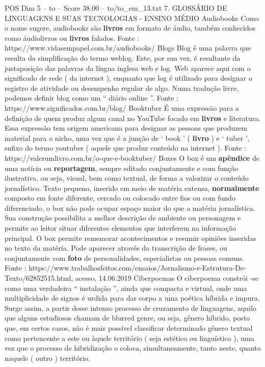 \begin{textsample}{POS Dim 5 – to – Score 38.00 – to/to\_em\_13.txt}  \label{ex:f5_pos_022}
7.
GLOSSÁRIO DE LINGUAGENS E SUAS TECNOLOGIAS - ENSINO MÉDIO Audiobooks Como o nome sugere, audiobooks são \textbf{livros} em formato de áudio, também conhecidos como áudiolivros ou \textbf{livros} falados.
Fonte : https://www.vidasempapel.com.br/audiobooks/ Blogs Blog é uma palavra que resulta da simplificação do termo weblog.
Este, por sua vez, é resultante da justaposição das palavras da língua inglesa web e log.
Web aparece aqui com o significado de rede ( da internet ), enquanto que log é utilizado para designar o registro de atividade ou desempenho regular de algo.
Numa tradução livre, podemos definir blog como um “ diário online ”.
Fonte : https://www.significados.com.br/blog/ Booktuber É uma expressão para a definição de quem produz algum canal no YouTube focado em \textbf{livros} e literatura.
Essa expressão tem origem americana para designar as pessoas que produzem material para o nicho, uma vez que é a junção de ‘ book ’ ( \textbf{livro} ) e ‘ tuber ’, sufixo do termo youtuber ( aquele que produz conteúdo na internet ).
Fonte : https://valerumlivro.com.br/o-que-e-booktuber/ Boxes O box é um \textbf{apêndice} de uma notícia ou \textbf{reportagem}, sempre editado conjuntamente e com função ilustrativa, ou seja, visual, bem como textual, de forma a valorizar o conteúdo jornalístico.
Texto pequeno, inserido em meio de matéria extensa, \textbf{normalmente} composto em fonte diferente, cercado ou colocado entre fios ou com fundo diferenciado, o box não pode ocupar espaço maior do que a matéria jornalística.
Sua construção possibilita a melhor descrição de ambiente ou personagem e permite ao leitor situar diferentes elementos que interferem na informação principal.
O box permite rememorar acontecimentos e resumir opiniões inseridas no texto da matéria.
Pode aparecer através da transcrição de frases, ou conjuntamente com \textbf{foto} de personalidades, especialistas ou pessoas comuns.
Fonte : https://www.trabalhosfeitos.com/ensaios/Jornalismo-e-Estrutura-De-Texto/62852515.html, acesso, 14.06.2019 Ciberpoemas O ciberpoema constrói -se como uma verdadeira “ instalação ”, ainda que compacta e virtual, onde uma multiplicidade de signos é urdida para dar corpo a uma poética híbrida e impura.
Surge assim, a partir desse intenso processo de cruzamento de linguagens, aquilo que alguns estudiosos chamam de blurred genre, ou seja, gênero híbrido, posto que, em certos casos, não é mais possível classificar determinado gênero textual como pertencente a este ou àquele território ( seja estético ou linguístico ), uma vez que o processo de hibridização o coloca, simultaneamente, tanto neste, quanto naquele ( outro ) território.

\end{textsample}
